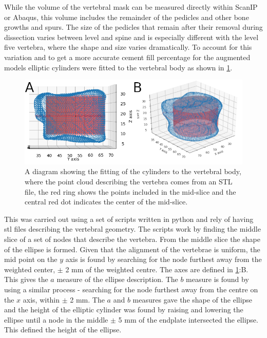 While the volume of the vertebral mask can be measured directly within ScanIP
or Abaqus, this volume includes the remainder of the pedicles and other bone growths and spurs.
The size of the pedicles that remain after their removal during dissection
varies between level and spine and is especially different with the level five
vertebra, where the shape and size varies dramatically.
To account for this variation and to get a more accurate cement fill percentage
for the augmented models elliptic cylinders were fitted to the vertebral body
as shown in \cref{fig:cyl_fit}.



\begin{figure}[ht!]
  \centering
 
\includegraphics[width=5in]{Chapters/Chapter_HT_images/cyl_fit_ful_iso_both.png}
  \caption{A diagram showing the fitting of the cylinders to the vertebral
body, where the point cloud describing the vertebra comes from an STL file, the
red ring shows the points included in the mid-slice and the central red dot
indicates the center of the mid-slice.}
  \label{fig:cyl_fit}
\end{figure}


This was carried out using a set of scripts written in python and rely of
having stl files describing the vertebral geometry.
The scripts work by finding the middle slice of a set of nodes that describe
the vertebra.
From the middle slice the shape of the ellipse is formed.
Given that the alignment of the vertebrae is uniform, the mid point on the $y$
axis is found by searching for the node furthest away from the weighted center,
$\pm$ 2 mm of the weighted centre. The axes are defined in \cref{fig:cyl_fit}:B.
This gives the $a$ measure of the ellipse description.
The $b$ measure is found by using a similar process - searching for the node
furthest away from the centre on the $x$ axis, within $\pm$ 2 mm.
The $a$ and $b$ measures gave the shape of the ellipse and the height of the
elliptic cylinder was found by raising and lowering the ellipse until a node in
the middle $\pm$ 5 mm of the endplate intersected the ellipse.
This defined the height of the ellipse.

